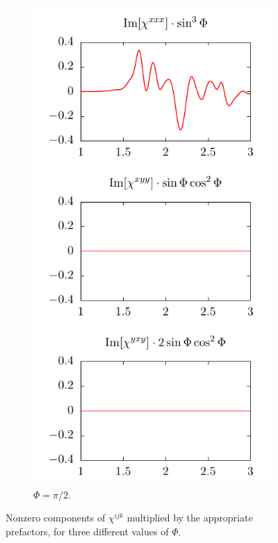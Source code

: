 \documentclass[aps,prb,10pt,letterpaper,notitlepage]{revtex4-1}
\begin{document}
\begin{figure}[t]
\begin{subfigure}[b]{0.3\textwidth}
        \includegraphics[width=\textwidth]{rot/comps90.pdf}
        \caption{$\Phi = \pi/2$.}
    \end{subfigure}
    \caption{Nonzero components of $\chi^{ijk}$ multiplied by the appropriate
    prefactors, for three different values of $\Phi$.}
    \label{fig:comps}
\end{figure}
\end{document}
